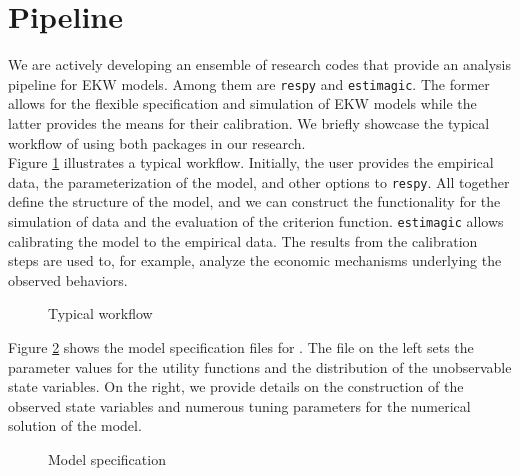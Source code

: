 \section{Pipeline}
We are actively developing an ensemble of research codes that provide an analysis pipeline for EKW models. Among them are \verb+respy+ and \verb+estimagic+. The former allows for the flexible specification and simulation of EKW models while the latter provides the means for their calibration. We briefly showcase the typical workflow of using both packages in our research.\\

\noindent Figure \ref{Typical workflow} illustrates a typical workflow. Initially, the user provides the empirical data, the parameterization of the model, and other options to \verb+respy+. All together define the structure of the model, and we can construct the functionality for the simulation of data and the evaluation of the criterion function. \verb+estimagic+ allows calibrating the model to the empirical data. The results from the calibration steps are used to, for example, analyze the economic mechanisms underlying the observed behaviors.

\begin{figure}[ht!]\centering
\caption{Typical workflow}\label{Typical workflow}

\end{figure}\FloatBarrier

\noindent Figure \ref{Model specification} shows the model specification files for \citet{Keane.1997}. The file on the left sets the parameter values for the utility functions and the distribution of the unobservable state variables. On the right, we provide details on the construction of the observed state variables and numerous tuning parameters for the numerical solution of the model.

\begin{figure}[h!]\centering
	\captionsetup[subfloat]{captionskip=12pt}
	\caption{Model specification}\label{Model specification}
	\hspace{0.3cm}
\end{figure}\FloatBarrier


